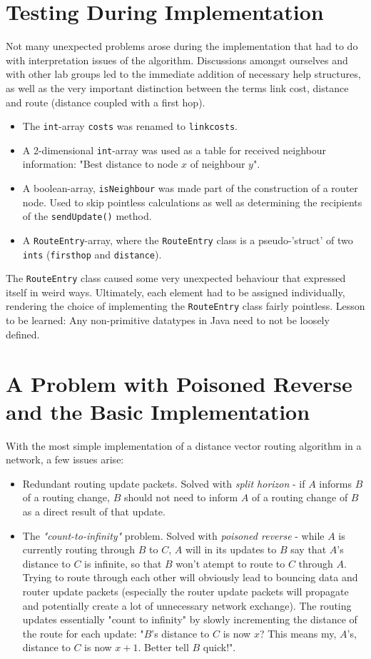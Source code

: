 \documentclass[10pt,a4paper]{article}
\begin{document}
\section{Testing During Implementation}
Not many unexpected problems arose during the implementation that had to do with interpretation issues of the algorithm. Discussions amongst ourselves and with other lab groups led to the immediate addition of necessary help structures, as well as the very important distinction between the terms link cost, distance and route (distance coupled with a first hop).
\begin{itemize}
\item The \verb=int=-array \verb=costs= was renamed to \verb=linkcosts=.
\item  A 2-dimensional \verb=int=-array was used as a table for received neighbour information: "Best distance to node $x$ of neighbour $y$".
\item  A boolean-array, \verb=isNeighbour= was made part of the construction of a router node. Used to skip pointless calculations as well as determining the recipients of the \verb=sendUpdate()= method.
\item  A \verb=RouteEntry=-array, where the \verb=RouteEntry= class is a pseudo-'struct' of two \verb=ints= (\verb=firsthop= and \verb=distance=).
\end{itemize}

The \verb=RouteEntry= class caused some very unexpected behaviour that expressed itself in weird ways. Ultimately, each element had to be assigned individually, rendering the choice of implementing the \verb=RouteEntry= class fairly pointless. Lesson to be learned: Any non-primitive datatypes in Java need to not be loosely defined.


\section{A Problem with Poisoned Reverse and the Basic Implementation}
With the most simple implementation of a distance vector routing algorithm in a network, a few issues arise:
\begin{itemize}
  \item Redundant routing update packets. Solved with \emph{split horizon}\cite{tcpip} - if $A$ informs $B$ of a routing change, $B$ should not need to inform $A$ of a routing change of $B$ as a direct result of that update.
  \item  The \emph{"count-to-infinity"} problem. Solved with \emph{poisoned reverse} - while $A$ is currently routing through $B$ to $C$, $A$ will in its updates to $B$ say that $A$'s distance to $C$ is infinite, so that $B$ won't atempt to route to $C$ through $A$. Trying to route through each other will obviously lead to bouncing data and router update packets (especially the router update packets will propagate and potentially create a lot of unnecessary network exchange). The routing updates essentially "count to infinity" by slowly incrementing the distance of the route for each update: "$B$'s distance to $C$ is now $x$? This means my, $A$'s, distance to $C$ is now $x+1$. Better tell $B$ quick!".
\end{itemize}
\end{document}
